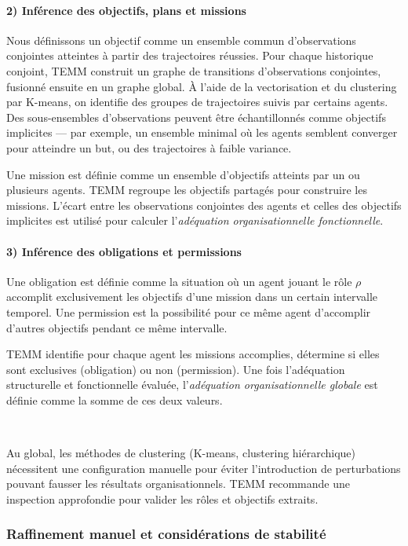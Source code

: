 \documentclass[pdflatex,sn-mathphys-num]{sn-jnl}%
\theoremstyle{thmstyleone}%
\theoremstyle{thmstyletwo}%
\theoremstyle{thmstylethree}%
\begin{document}
\paragraph{2) Inférence des objectifs, plans et missions}

Nous définissons un objectif comme un ensemble commun d'observations conjointes atteintes à partir des trajectoires réussies.  
Pour chaque historique conjoint, TEMM construit un graphe de transitions d'observations conjointes, fusionné ensuite en un graphe global. À l'aide de la vectorisation et du clustering par K-means, on identifie des groupes de trajectoires suivis par certains agents. Des sous-ensembles d'observations peuvent être échantillonnés comme objectifs implicites — par exemple, un ensemble minimal où les agents semblent converger pour atteindre un but, ou des trajectoires à faible variance.

Une mission est définie comme un ensemble d'objectifs atteints par un ou plusieurs agents. TEMM regroupe les objectifs partagés pour construire les missions.  
L'écart entre les observations conjointes des agents et celles des objectifs implicites est utilisé pour calculer l'\textit{adéquation organisationnelle fonctionnelle}.

\paragraph{3) Inférence des obligations et permissions}

Une obligation est définie comme la situation où un agent jouant le rôle $\rho$ accomplit exclusivement les objectifs d'une mission dans un certain intervalle temporel. Une permission est la possibilité pour ce même agent d'accomplir d'autres objectifs pendant ce même intervalle.

TEMM identifie pour chaque agent les missions accomplies, détermine si elles sont exclusives (obligation) ou non (permission).  
Une fois l'adéquation structurelle et fonctionnelle évaluée, l'\textit{adéquation organisationnelle globale} est définie comme la somme de ces deux valeurs.

\

Au global, les méthodes de clustering (K-means, clustering hiérarchique) nécessitent une configuration manuelle pour éviter l'introduction de perturbations pouvant fausser les résultats organisationnels. TEMM recommande une inspection approfondie pour valider les rôles et objectifs extraits.

\subsubsection{Raffinement manuel et considérations de stabilité}
\end{document}

